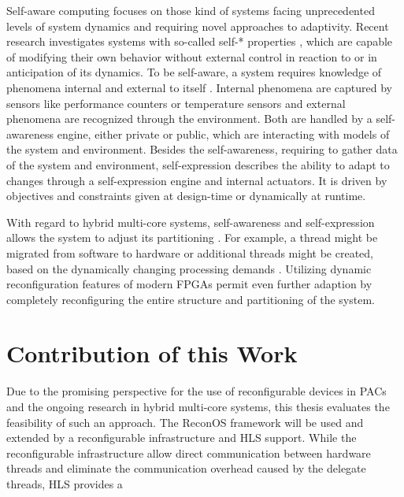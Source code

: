 Self-aware computing focuses on those kind of systems facing unprecedented
levels of system dynamics and requiring novel approaches to adaptivity. Recent
research investigates systems with so-called self-* properties \citep{SMC11},
which are capable of modifying their own behavior without external control in
reaction to or in anticipation of its dynamics. To be self-aware, a system
requires knowledge of phenomena internal and external to itself \citep{LCP11}.
Internal phenomena are captured by sensors like performance counters or
temperature sensors and external phenomena are recognized through the
environment. Both are handled by a self-awareness engine, either private or
public, which are interacting with models of the system and environment.
Besides the self-awareness, requiring to gather data of the system and
environment, self-expression describes the ability to adapt to changes through
a self-expression engine and internal actuators. It is driven by objectives
and constraints given at design-time or dynamically at runtime.

With regard to hybrid multi-core systems, self-awareness and self-expression
allows the system to adjust its partitioning \citep{AHL14}. For example, a
thread might be migrated from software to hardware or additional threads might
be created, based on the dynamically changing processing demands
\citep{HLP09}. Utilizing dynamic reconfiguration features of modern \acp{FPGA}
permit even further adaption by completely reconfiguring the entire structure
and partitioning of the system.

\section{Contribution of this Work}
Due to the promising perspective for the use of reconfigurable devices in
\acp{PAC} and the ongoing research in hybrid multi-core systems, this thesis
evaluates the feasibility of such an approach. The ReconOS framework will be
used and extended by a reconfigurable infrastructure and \ac{HLS} support.
While the reconfigurable infrastructure allow direct communication between
hardware threads and eliminate the communication overhead caused by the
delegate threads, \ac{HLS} provides a 

